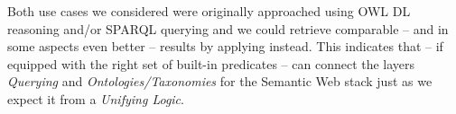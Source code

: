 Both use cases we considered were originally approached using OWL DL reasoning and/or SPARQL querying and we could retrieve 
comparable -- and in some aspects even better -- results by applying 
\nthreelogic instead. This indicates that \nthreelogic -- if equipped with the right set of built-in predicates -- can connect the layers \emph{Querying}
and \emph{Ontologies/Taxonomies} for the Semantic Web stack just as we expect it from a \emph{Unifying Logic}.